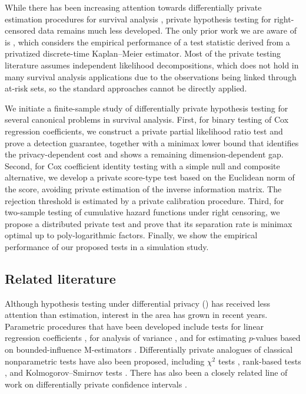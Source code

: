 \documentclass[11pt]{article}
\begin{document}
While there has been increasing attention towards differentially private estimation procedures for survival analysis 
\citep[e.g.][]{Nguyen2017DPsurvival, pmlr-v126-gondara20a, EgeaEscobar2025survival, FDPCox}, private hypothesis testing for right-censored data remains much less developed. The only prior work we are aware of is \cite{pmlr-v126-gondara20a}, which considers the empirical performance of a test statistic derived from a privatized discrete-time Kaplan--Meier estimator. Most of the private testing literature assumes independent likelihood decompositions, which does not hold in many survival analysis applications due to the observations being linked through at-risk sets, so the standard approaches cannot be directly applied.

We initiate a finite-sample study of differentially private hypothesis testing for several canonical problems in survival analysis. First, for binary testing of Cox regression coefficients, we construct a private partial likelihood ratio test and prove a detection guarantee, together with a minimax lower bound that identifies the privacy-dependent cost and shows a remaining dimension-dependent gap. Second, for Cox coefficient identity testing with a simple null and composite alternative, we develop a private score-type test based on the Euclidean norm of the score, avoiding private estimation of the inverse information matrix. The rejection threshold is estimated by a private calibration procedure. Third, for two-sample testing of cumulative hazard functions under right censoring, we propose a distributed private test and prove that its separation rate is minimax optimal up to poly-logarithmic factors. Finally, we show the empirical performance of our proposed tests in a simulation study. 

\subsection{Related literature}
Although hypothesis testing under differential privacy () has received less attention than estimation, interest in the area has grown in recent years. Parametric procedures that have been developed include tests for linear regression coefficients \citep[e.g.][]{sheffet2017differentially, barrientos2019regression, alabi2023regression}, for analysis of variance \citep[e.g.][]{campbell2018dpanova}, and for estimating $p$-values based on bounded-influence M-estimators \citep[e.g.][]{avella2020privacy}. Differentially private analogues of classical nonparametric tests have also been proposed, including $\chi^2$ tests \citep[e.g.][]{gaboardi2016dpchisq, rogers2017privatechisq}, rank-based tests \citep[e.g.][]{couch2019dpnonparametric}, and Kolmogorov--Smirnov tests \citep[e.g.][]{awan2025KS}. There has also been a closely related line of work on differentially private confidence intervals \citep[e.g.][]{ferrando2022DPCI, chadha2024resampling, wang2025dpbootstrap}. 
\end{document}
